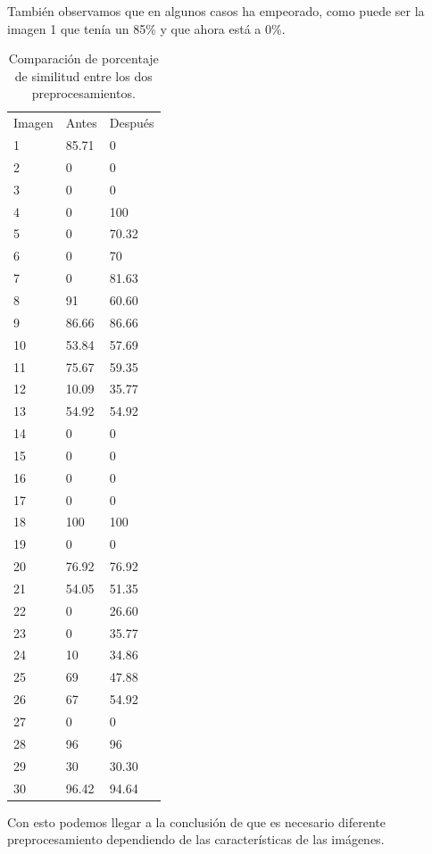 También observamos que en algunos casos ha empeorado, como puede ser la imagen 1 que tenía un 85\% y que ahora está a 0\%. 
\begin{table}[H]
	\centering
	\begin{tabular}{lll} 
		Imagen & Antes  & Después \\
		1  & 85.71 & 0      \\     
		2  & 0     & 0      \\  
		3  & 0     & 0      \\  
		4  & 0     & 100    \\  
		5  & 0     & 70.32  \\  
		6  & 0     & 70  \\ 
		7  & 0     & 81.63  \\  
		8  & 91    & 60.60  \\  
		9  & 86.66 & 86.66  \\  
		10 & 53.84 & 57.69  \\  
		11 & 75.67 & 59.35  \\  
		12 & 10.09 & 35.77  \\  
		13 & 54.92 & 54.92  \\  
		14 & 0     & 0      \\  
		15 & 0     & 0      \\  
		16 & 0     & 0      \\  
		17 & 0     & 0      \\  
		18 & 100   & 100    \\    
		19 & 0     & 0      \\     
		20 & 76.92 & 76.92  \\  
		21 & 54.05 & 51.35  \\  
		22 & 0     & 26.60  \\  
		23 & 0     & 35.77  \\  
		24 & 10    & 34.86  \\  
		25 & 69    & 47.88  \\  
		26 & 67    & 54.92  \\  
		27 & 0     & 0      \\  
		28 & 96    & 96     \\  
		29 & 30    & 30.30  \\  
		30 & 96.42 & 94.64  \\  
	\end{tabular}
		\caption{Comparación de porcentaje de similitud entre los dos preprocesamientos.}
	\label{table:simi}
\end{table}
Con esto podemos llegar a la conclusión de que es necesario diferente preprocesamiento dependiendo de las características de las imágenes.
